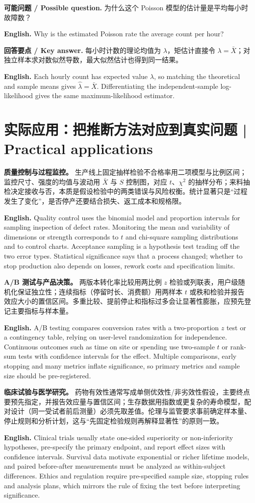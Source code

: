 \documentclass[UTF8,11pt,a4paper]{ctexart}
\newcommand{\EN}[1]{\par\noindent\textbf{English.} #1\par}
\newcommand{\ASK}[4]{\par\noindent\textbf{可能问题 / Possible question.} #1\par\EN{#2}\noindent\textbf{回答要点 / Key answer.} #3\par\EN{#4}\medskip}
\begin{document}
\ASK{为什么这个 Poisson 模型的估计量是平均每小时故障数？}{Why is the estimated Poisson rate the average count per hour?}{每小时计数的理论均值为 $\lambda$，矩估计直接令 $\lambda=\bar X$；对独立样本求对数似然导数，最大似然估计也得到同一结果。}{Each hourly count has expected value $\lambda$, so matching the theoretical and sample means gives $\hat\lambda=\bar X$. Differentiating the independent-sample log-likelihood gives the same maximum-likelihood estimator.}


\section{实际应用：把推断方法对应到真实问题 | Practical applications}
\noindent\textbf{质量控制与过程监控。} 生产线上固定抽样检验不合格率用二项模型与比例区间；监控尺寸、强度的均值与波动用 $\bar X$ 与 $S$ 控制图，对应 $t$、$\chi^2$ 的抽样分布；来料抽检决定接收与否，本质是假设检验中的两类错误与风险权衡。统计显著只是“过程发生了变化”，是否停产还要结合损失、返工成本和规格限。
\EN{Quality control uses the binomial model and proportion intervals for sampling inspection of defect rates. Monitoring the mean and variability of dimensions or strength corresponds to $t$ and chi-square sampling distributions and to control charts. Acceptance sampling is a hypothesis test trading off the two error types. Statistical significance says that a process changed; whether to stop production also depends on losses, rework costs and specification limits.}

\noindent\textbf{A/B 测试与产品决策。} 两版本转化率比较用两比例 $z$ 检验或列联表，用户级随机化保证独立性；连续指标（停留时长、消费额）用两样本 $t$ 或秩和检验并报告效应大小的置信区间。多重比较、提前停止和指标过多会让显著性膨胀，应预先登记主要指标与样本量。
\EN{A/B testing compares conversion rates with a two-proportion $z$ test or a contingency table, relying on user-level randomization for independence. Continuous outcomes such as time on site or spending use two-sample $t$ or rank-sum tests with confidence intervals for the effect. Multiple comparisons, early stopping and many metrics inflate significance, so primary metrics and sample size should be pre-registered.}

\noindent\textbf{临床试验与医学研究。} 药物有效性通常写成单侧优效性/非劣效性假设，主要终点要预先指定，并报告效应量与置信区间；生存数据用指数或更复杂的寿命模型，配对设计（同一受试者前后测量）必须先取差值。伦理与监管要求事前确定样本量、停止规则和分析计划，这与“先固定检验规则再解释显著性”的原则一致。
\EN{Clinical trials usually state one-sided superiority or non-inferiority hypotheses, pre-specify the primary endpoint, and report effect sizes with confidence intervals. Survival data motivate exponential or richer lifetime models, and paired before-after measurements must be analyzed as within-subject differences. Ethics and regulation require pre-specified sample size, stopping rules and analysis plans, which mirrors the rule of fixing the test before interpreting significance.}
\end{document}

